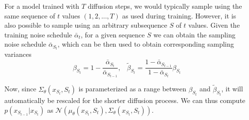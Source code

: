 \documentclass{article}
\newcommand{\remark}[1]{{\color{red}{{[#1]}}}}
\begin{document}

For a model trained with $T$ diffusion steps, we would typically sample using the same sequence of $t$ values $(1, 2, ..., T)$ as used during training. However, it is also possible to sample using an arbitrary subsequence $S$ of $t$ values. Given the training noise schedule $\bar{\alpha}_t$, for a given sequence $S$ we can obtain the sampling noise schedule $\bar{\alpha}_{S_t}$, which can be then used to obtain corresponding sampling variances
\begin{equation}
\beta_{S_{t}} = 1 - \frac{\bar{\alpha}_{S_t}}{\bar{\alpha}_{S_{t-1}}},\;\;\;\tilde{\beta}_{S_t} = \frac{1-\bar{\alpha}_{S_{t-1}}}{1-\bar{\alpha}_{S_t}} \beta_{S_t}
\end{equation}

Now, since $\Sigma_{\theta}(x_{S_t}, S_t)$ is parameterized as a range between $\beta_{S_t}$ and $\tilde{\beta}_{S_t}$, it will automatically be rescaled for the shorter diffusion process. We can thus compute $p(x_{S_{t-1}}|x_{S_t})$ as $\mathcal{N}(\mu_{\theta}(x_{S_t}, S_t), \Sigma_{\theta}(x_{S_t}, S_t))$. 
\end{document}
